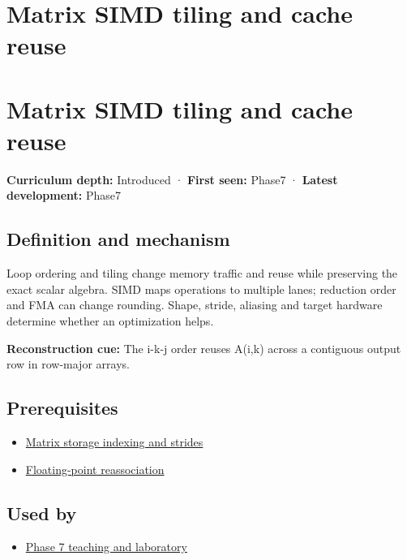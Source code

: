 \hypertarget{appendix-1bfb7c657105}{}
\section*{Matrix SIMD tiling and cache reuse}
\section{Matrix SIMD tiling and cache reuse}\label{matrix-simd-tiling-and-cache-reuse}

\textbf{Curriculum depth:} Introduced · \textbf{First seen:} Phase7 · \textbf{Latest development:} Phase7

\subsection{Definition and mechanism}\label{definition-and-mechanism}

Loop ordering and tiling change memory traffic and reuse while preserving the exact scalar algebra. SIMD maps operations to multiple lanes; reduction order and FMA can change rounding. Shape, stride, aliasing and target hardware determine whether an optimization helps.

\textbf{Reconstruction cue:} The i-k-j order reuses A(i,k) across a contiguous output row in row-major arrays.

\subsection{Prerequisites}\label{prerequisites}

\begin{itemize}
\tightlist
\item
  \hyperref[appendix-ffdc1d4e5350]{Matrix storage indexing and strides}
\item
  \hyperref[appendix-c2ac4a84c283]{Floating-point reassociation}
\end{itemize}

\subsection{Used by}\label{used-by}

\begin{itemize}
\tightlist
\item
  \href{Continuous\%20Notes/Computing\%20Foundations\%20-\%20From\%20Bits\%20to\%20C++\%20and\%20Systems\%20APIs\#Keep\%20the\%20promises\%20visible\%20while\%20moving\%20between\%20representations}{Phase 7 teaching and laboratory}
\end{itemize}

